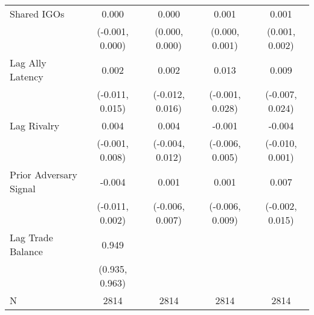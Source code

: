 \begin{tabular}[t]{lcccc}
Shared IGOs & 0.000 & 0.000 & 0.001 & 0.001\\
 & (-0.001, 0.000) & (0.000, 0.000) & (0.000, 0.001) & (0.001, 0.002)\\
Lag Ally Latency & 0.002 & 0.002 & 0.013 & 0.009\\
 & (-0.011, 0.015) & (-0.012, 0.016) & (-0.001, 0.028) & (-0.007, 0.024)\\
Lag Rivalry & 0.004 & 0.004 & -0.001 & -0.004\\
 & (-0.001, 0.008) & (-0.004, 0.012) & (-0.006, 0.005) & (-0.010, 0.001)\\
Prior Adversary Signal & -0.004 & 0.001 & 0.001 & 0.007\\
 & (-0.011, 0.002) & (-0.006, 0.007) & (-0.006, 0.009) & (-0.002, 0.015)\\
Lag Trade Balance & 0.949 &  &  & \\
 & (0.935, 0.963) &  &  & \\
\midrule
N & 2814 & 2814 & 2814 & 2814\\
\bottomrule
\end{tabular}

